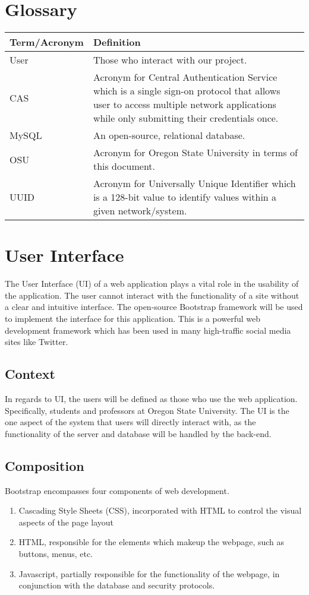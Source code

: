 \documentclass[onecolumn, draftclsnofoot,10pt, compsoc]{IEEEtran}
\begin{document}
\section*{Glossary}
  \begin{tabu} to 
        \hline
        \textbf{Term/Acronym} & \textbf{Definition}\\
        \hline
        User & Those who interact with our project. \\
        \hline
        CAS & Acronym for Central Authentication Service which is a single sign-on protocol that allows user to access multiple network applications while only submitting their credentials once.\\
        \hline
        MySQL & An open-source, relational database.\\
        \hline
        OSU & Acronym for Oregon State University in terms of this document.\\
        \hline
        UUID & Acronym for Universally Unique Identifier which is a 128-bit value to identify values within a given network/system.\\
        \hline
\end{tabu}


\section{User Interface}
The User Interface (UI) of a web application plays a vital role in the usability of the application. The user cannot interact with the functionality of a site without a clear and intuitive interface. The open-source Bootstrap framework will be used to implement the interface for this application. This is a powerful web development framework which has been used in many high-traffic social media sites like Twitter.

\subsection{Context}
In regards to UI, the users will be defined as those who use the web application. Specifically, students and professors at Oregon State University. The UI is the one aspect of the system that users will directly interact with, as the functionality of the server and database will be handled by the back-end.

\subsection{Composition}
Bootstrap encompasses four components of web development.
\begin{enumerate}
    \item Cascading Style Sheets (CSS), incorporated with HTML to control the visual aspects of the page layout
    \item HTML, responsible for the elements which makeup the webpage, such as buttons, menus, etc.
    \item Javascript, partially responsible for the functionality of the webpage, in conjunction with the database and security protocols.
\end{enumerate}
\end{document}
